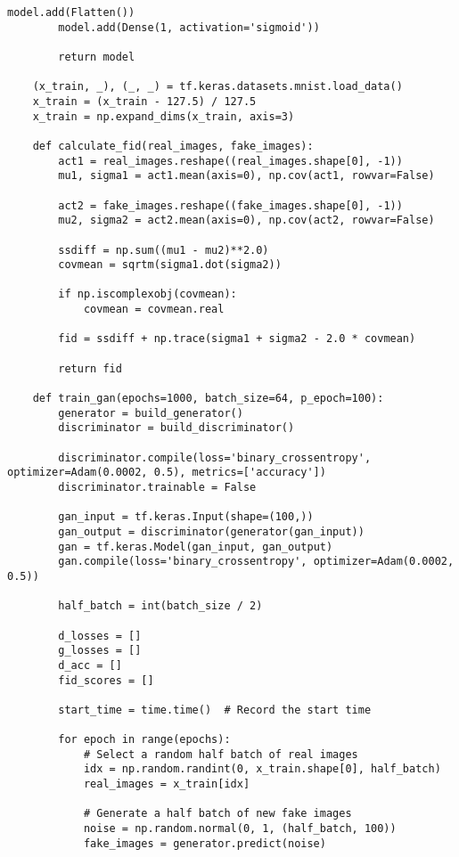 \begin{lstlisting}[style=mypython, caption=Explore GAN with more convolutional layers 2]
        model.add(Flatten())
        model.add(Dense(1, activation='sigmoid'))
    
        return model
    
    (x_train, _), (_, _) = tf.keras.datasets.mnist.load_data()
    x_train = (x_train - 127.5) / 127.5
    x_train = np.expand_dims(x_train, axis=3)
    
    def calculate_fid(real_images, fake_images):
        act1 = real_images.reshape((real_images.shape[0], -1))
        mu1, sigma1 = act1.mean(axis=0), np.cov(act1, rowvar=False)
        
        act2 = fake_images.reshape((fake_images.shape[0], -1))
        mu2, sigma2 = act2.mean(axis=0), np.cov(act2, rowvar=False)
        
        ssdiff = np.sum((mu1 - mu2)**2.0)
        covmean = sqrtm(sigma1.dot(sigma2))
        
        if np.iscomplexobj(covmean):
            covmean = covmean.real
        
        fid = ssdiff + np.trace(sigma1 + sigma2 - 2.0 * covmean)
        
        return fid
    
    def train_gan(epochs=1000, batch_size=64, p_epoch=100):
        generator = build_generator()
        discriminator = build_discriminator()
    
        discriminator.compile(loss='binary_crossentropy', optimizer=Adam(0.0002, 0.5), metrics=['accuracy'])
        discriminator.trainable = False
    
        gan_input = tf.keras.Input(shape=(100,))
        gan_output = discriminator(generator(gan_input))
        gan = tf.keras.Model(gan_input, gan_output)
        gan.compile(loss='binary_crossentropy', optimizer=Adam(0.0002, 0.5))
    
        half_batch = int(batch_size / 2)
        
        d_losses = []
        g_losses = []
        d_acc = []
        fid_scores = []
        
        start_time = time.time()  # Record the start time
    
        for epoch in range(epochs):
            # Select a random half batch of real images
            idx = np.random.randint(0, x_train.shape[0], half_batch)
            real_images = x_train[idx]
    
            # Generate a half batch of new fake images
            noise = np.random.normal(0, 1, (half_batch, 100))
            fake_images = generator.predict(noise)
    

\end{lstlisting}
